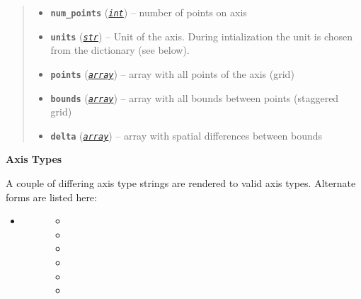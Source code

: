 \documentclass[a4paper,10pt,english]{sphinxmanual}
\begin{document}
\begin{fulllineitems}
\begin{quote}
\begin{description}
\begin{itemize}
\item {} 
\textbf{\texttt{num\_points}} (\href{http://docs.python.org/2.7/library/functions.html\#int}{\emph{\texttt{int}}}) -- number of points on axis

\item {} 
\textbf{\texttt{units}} (\href{http://docs.python.org/2.7/library/functions.html\#str}{\emph{\texttt{str}}}) -- Unit of the axis. During intialization the unit is 
chosen from the  dictionary (see below).

\item {} 
\textbf{\texttt{points}} (\href{http://docs.python.org/2.7/library/array.html\#module-array}{\emph{\texttt{array}}}) -- array with all points of the axis (grid)

\item {} 
\textbf{\texttt{bounds}} (\href{http://docs.python.org/2.7/library/array.html\#module-array}{\emph{\texttt{array}}}) -- array with all bounds between points (staggered grid)

\item {} 
\textbf{\texttt{delta}} (\href{http://docs.python.org/2.7/library/array.html\#module-array}{\emph{\texttt{array}}}) -- array with spatial differences between bounds

\end{itemize}

\end{description}\end{quote}

\textbf{Axis Types}

A couple of differing axis type strings are rendered to valid axis types.
Alternate forms are listed here:
\begin{itemize}
\item {} \begin{description}
\item[{}] \leavevmode\begin{itemize}
\item {} 

\item {} 

\item {} 

\item {} 

\item {} 

\item {} 


\end{itemize}
\end{description}
\end{itemize}
\end{fulllineitems}
\end{document}
